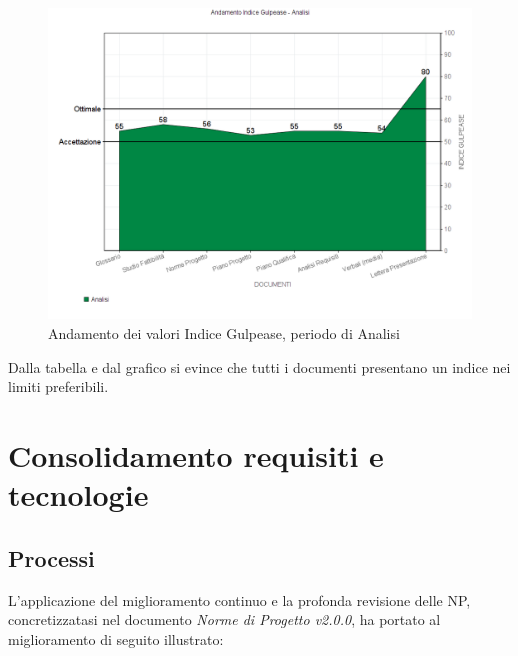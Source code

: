 \documentclass[openany,12pt,a4paper]{report}
\begin{document}
\begin{itemize}
	\begin{figure}[H]
		\includegraphics[scale=0.5]{verifica-analisi-gulpease}
		\centering
		\caption{Andamento dei valori Indice Gulpease, periodo di Analisi}
	\end{figure}
		
	Dalla tabella e dal grafico si evince che tutti i documenti presentano un indice nei limiti preferibili.

\end{itemize}


\section{Consolidamento requisiti e tecnologie}

\subsection{Processi}

L'applicazione del miglioramento continuo e la profonda revisione delle NP, concretizzatasi nel documento \textit{Norme di Progetto v2.0.0}, ha portato al miglioramento di seguito illustrato:

\newpage
\end{document}

